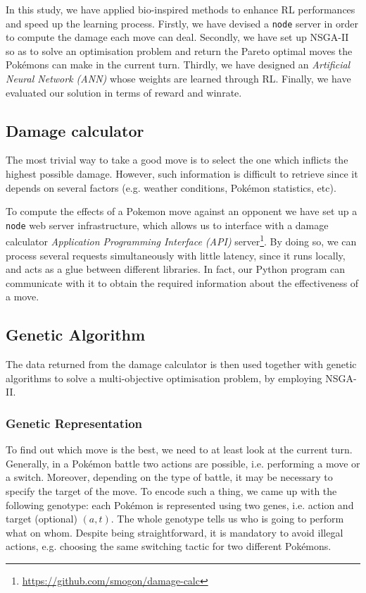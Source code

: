In this study, we have applied bio-inspired methods to enhance RL performances and speed up the learning process. Firstly, we have devised a \texttt{node} server in order to compute the damage each move can deal. Secondly, we have set up NSGA-II so as to solve an optimisation problem and return the Pareto optimal moves the Pokémons can make in the current turn. Thirdly, we have designed an \emph{Artificial Neural Network (ANN)} whose weights are learned through RL. Finally, we have evaluated our solution in terms of reward and winrate.

\subsection{Damage calculator}
The most trivial way to take a good move is to select the one which inflicts the highest possible damage. However, such information is difficult to retrieve since it depends on several factors (e.g. weather conditions, Pokémon statistics, etc).

To compute the effects of a Pokemon move against an opponent we have set up a \texttt{node} web server infrastructure, which allows us to interface with a damage calculator \emph{Application Programming Interface (API)} server\footnote{\url{https://github.com/smogon/damage-calc}}. By doing so, we can process several requests simultaneously with little latency, since it runs locally, and acts as a glue between different libraries. In fact, our Python program can communicate with it to obtain the required information about the effectiveness of a move.

\subsection{Genetic Algorithm}
The data returned from the damage calculator is then used together with genetic algorithms to solve a multi-objective optimisation problem, by employing NSGA-II.

\subsubsection{Genetic Representation}
To find out which move is the best, we need to at least look at the current turn. Generally, in a Pokémon battle two actions are possible, i.e. performing a move or a switch. Moreover, depending on the type of battle, it may be necessary to specify the target of the move. To encode such a thing, we came up with the following genotype: each Pokémon is represented using two genes, i.e. action and target (optional) $(a, t)$. The whole genotype tells us who is going to perform what on whom. Despite being straightforward, it is mandatory to avoid illegal actions, e.g. choosing the same switching tactic for two different Pokémons.

